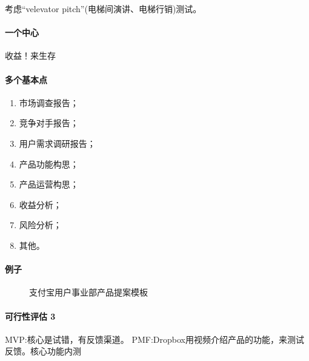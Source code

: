 \documentclass[letterpaper,11pt,english]{sphinxmanual}
\begin{document}
考虑“velevator pitch”(电梯间演讲、电梯行销)测试。


\paragraph{一个中心}
\label{\detokenize{chapter_skill/BRD:id6}}
收益！来生存


\paragraph{多个基本点}
\label{\detokenize{chapter_skill/BRD:id7}}\begin{enumerate}
%
\item {} 
市场调查报告；

\item {} 
竞争对手报告；

\item {} 
用户需求调研报告；

\item {} 
产品功能构思；

\item {} 
产品运营构思；

\item {} 
收益分析；

\item {} 
风险分析；

\item {} 
其他。

\end{enumerate}


\paragraph{例子}
\label{\detokenize{chapter_skill/BRD:id8}}
\begin{figure}[H]
\centering
\capstart

\noindent{}
\caption{支付宝用户事业部产品提案模板}\label{\detokenize{chapter_skill/BRD:id17}}\end{figure}


\paragraph{可行性评估 3\sphinxfootnotemark[147]}
\label{\detokenize{chapter_skill/BRD:id9}}%
\begin{footnotetext}[147]\sphinxAtStartFootnote
{}
%
\end{footnotetext}\ignorespaces 
MVP:核心是试错，有反馈渠道。
PMF:Dropbox用视频介绍产品的功能，来测试反馈。核心功能内测
\end{document}
